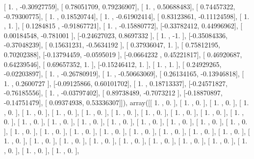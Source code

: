 \documentclass{article}
\begin{document}
       [ 1.        , -0.30927759],
       [ 0.78051709,  0.79236907],
       [ 1.        ,  0.50688483],
       [ 0.74457322, -0.79300775],
       [ 1.        ,  0.18520744],
       [ 1.        , -0.61902414],
       [ 0.83123861, -0.11124598],
       [ 1.        ,  1.        ],
       [ 0.1284815 , -0.91867721],
       [ 1.        , -0.15880772],
       [-0.33782412,  0.44996962],
       [ 0.00184548, -0.781001  ],
       [-0.24627023,  0.8697332 ],
       [ 1.        , -1.        ],
       [-0.35084336, -0.37048239],
       [ 0.15631231, -0.5634192 ],
       [ 0.37936047,  1.        ],
       [ 0.75812195,  0.70202388],
       [-0.13794459, -0.0595019 ],
       [-0.0664232 ,  0.45221817],
       [ 0.46920687,  0.64239546],
       [ 0.69657352,  1.        ],
       [-0.15246412,  1.        ],
       [ 1.        ,  1.        ],
       [ 0.24929265, -0.02203897],
       [ 1.        , -0.26780919],
       [ 1.        , -0.50663069],
       [ 0.26134165, -0.13946818],
       [ 1.        ,  0.2600727 ],
       [-0.09125866,  0.60101702],
       [ 1.        ,  0.18713337],
       [-0.24571827, -0.76185556],
       [ 1.        , -0.03797402],
       [ 0.89738489, -0.7073212 ],
       [-0.18870897, -0.14751479],
       [ 0.09374938,  0.53336307]]), array([[ 1.        ,  0.        ],
       [ 1.        ,  0.        ],
       [ 1.        ,  0.        ],
       [ 1.        ,  0.        ],
       [ 1.        ,  0.        ],
       [ 1.        ,  0.        ],
       [ 1.        ,  0.        ],
       [ 1.        ,  0.        ],
       [ 1.        ,  0.        ],
       [ 1.        ,  0.        ],
       [ 1.        ,  0.        ],
       [ 1.        ,  0.        ],
       [ 1.        ,  0.        ],
       [ 1.        ,  0.        ],
       [ 1.        ,  0.        ],
       [ 1.        ,  0.        ],
       [ 1.        ,  0.        ],
       [ 1.        ,  0.        ],
       [ 1.        ,  0.        ],
       [ 1.        ,  0.        ],
       [ 1.        ,  0.        ],
       [ 1.        ,  0.        ],
       [ 1.        ,  0.        ],
       [ 1.        ,  0.        ],
       [ 1.        ,  0.        ],
       [ 1.        ,  0.        ],
       [ 1.        ,  0.        ],
       [ 1.        ,  0.        ],
       [ 1.        ,  0.        ],
       [ 1.        ,  0.        ],
       [ 1.        ,  0.        ],
       [ 1.        ,  0.        ],
       [ 1.        ,  0.        ],
       [ 1.        ,  0.        ],
       [ 1.        ,  0.        ],
       [ 1.        ,  0.        ],
       [ 1.        ,  0.        ],
       [ 1.        ,  0.        ],
       [ 1.        ,  0.        ],
\end{document}
